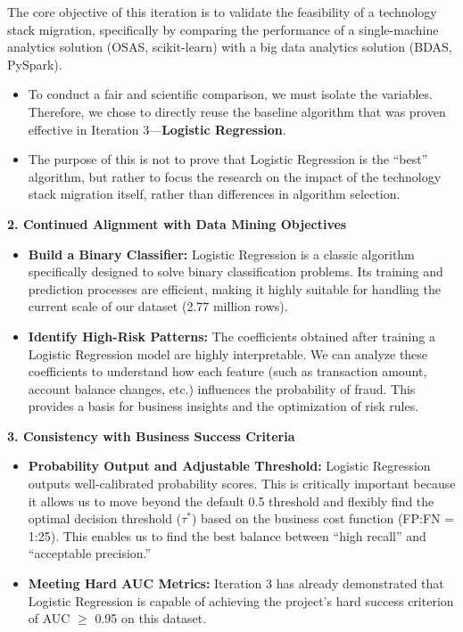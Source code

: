 \documentclass[sigplan,screen]{acmart}
\begin{document}
The core objective of this iteration is to validate the feasibility of a technology stack migration, specifically by comparing the performance of a single-machine analytics solution (OSAS, scikit-learn) with a big data analytics solution (BDAS, PySpark).

\begin{itemize}
\item To conduct a fair and scientific comparison, we must isolate the variables. Therefore, we chose to directly reuse the baseline algorithm that was proven effective in Iteration 3---\textbf{Logistic Regression}.
\item The purpose of this is not to prove that Logistic Regression is the ``best'' algorithm, but rather to focus the research on the impact of the technology stack migration itself, rather than differences in algorithm selection.
\end{itemize}

\textbf{2. Continued Alignment with Data Mining Objectives}

\begin{itemize}
\item \textbf{Build a Binary Classifier:} Logistic Regression is a classic algorithm specifically designed to solve binary classification problems. Its training and prediction processes are efficient, making it highly suitable for handling the current scale of our dataset (2.77 million rows).
\item \textbf{Identify High-Risk Patterns:} The coefficients obtained after training a Logistic Regression model are highly interpretable. We can analyze these coefficients to understand how each feature (such as transaction amount, account balance changes, etc.) influences the probability of fraud. This provides a basis for business insights and the optimization of risk rules.
\end{itemize}

\textbf{3. Consistency with Business Success Criteria}

\begin{itemize}
\item \textbf{Probability Output and Adjustable Threshold:} Logistic Regression outputs well-calibrated probability scores. This is critically important because it allows us to move beyond the default 0.5 threshold and flexibly find the optimal decision threshold ($\tau^*$) based on the business cost function (FP:FN = 1:25). This enables us to find the best balance between ``high recall'' and ``acceptable precision.''
\item \textbf{Meeting Hard AUC Metrics:} Iteration 3 has already demonstrated that Logistic Regression is capable of achieving the project's hard success criterion of AUC $\geq$ 0.95 on this dataset.
\end{itemize}
\end{document}

